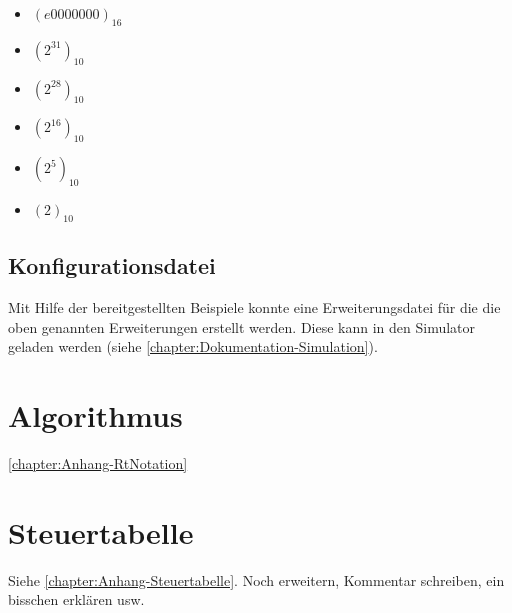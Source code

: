 \begin{itemize}
    \item $(e0000000)_{16}$
    \item $(2^{31})_{10}$
    \item $(2^{28})_{10}$
    \item $(2^{16})_{10}$
    \item $(2^5)_{10}$
    \item $(2)_{10}$
\end{itemize}

\subsection{Konfigurationsdatei}
\label{subsection:Dokumentation-Implementierung-Hardwareerweiterung-Konfigurationsdatei}

Mit Hilfe der bereitgestellten Beispiele konnte eine Erweiterungsdatei für die die oben genannten Erweiterungen erstellt werden. Diese kann in den Simulator geladen werden (siehe \autoref{chapter:Dokumentation-Simulation}).

\section{Algorithmus}
\label{section:Dokumentation-Implementierung-Algorithmus}

\autoref{chapter:Anhang-RtNotation}

\section{Steuertabelle}
\label{section:Dokumentation-Implementierung-Steuertabelle}

Siehe \autoref{chapter:Anhang-Steuertabelle}. Noch erweitern, Kommentar schreiben, ein bisschen erklären usw.
